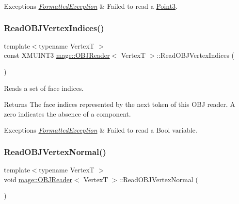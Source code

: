 \begin{DoxyExceptions}{Exceptions}
{\em \hyperlink{structmage_1_1_formatted_exception}{Formatted\+Exception}} & Failed to read a {\ttfamily \hyperlink{structmage_1_1_point3}{Point3}}. \\
\hline
\end{DoxyExceptions}
\hypertarget{classmage_1_1_o_b_j_reader_a2e807f8c18874135888d1e99d4d08d90}{}\label{classmage_1_1_o_b_j_reader_a2e807f8c18874135888d1e99d4d08d90} 
\subsubsection{\texorpdfstring{Read\+O\+B\+J\+Vertex\+Indices()}{ReadOBJVertexIndices()}}
{\footnotesize\ttfamily template$<$typename VertexT $>$ \\
const X\+M\+U\+I\+N\+T3 \hyperlink{classmage_1_1_o_b_j_reader}{mage\+::\+O\+B\+J\+Reader}$<$ VertexT $>$\+::Read\+O\+B\+J\+Vertex\+Indices (\begin{DoxyParamCaption}{ }\end{DoxyParamCaption})\hspace{0.3cm}{\ttfamily [private]}}

Reads a set of face indices.

\begin{DoxyReturn}{Returns}
The face indices represented by the next token of this O\+BJ reader. A zero indicates the absence of a component. 
\end{DoxyReturn}

\begin{DoxyExceptions}{Exceptions}
{\em \hyperlink{structmage_1_1_formatted_exception}{Formatted\+Exception}} & Failed to read a Bool variable. \\
\hline
\end{DoxyExceptions}
\hypertarget{classmage_1_1_o_b_j_reader_aa9ef2ced0ad787b13818722c7dfa0636}{}\label{classmage_1_1_o_b_j_reader_aa9ef2ced0ad787b13818722c7dfa0636} 
\subsubsection{\texorpdfstring{Read\+O\+B\+J\+Vertex\+Normal()}{ReadOBJVertexNormal()}}
{\footnotesize\ttfamily template$<$typename VertexT $>$ \\
void \hyperlink{classmage_1_1_o_b_j_reader}{mage\+::\+O\+B\+J\+Reader}$<$ VertexT $>$\+::Read\+O\+B\+J\+Vertex\+Normal (\begin{DoxyParamCaption}{ }\end{DoxyParamCaption})\hspace{0.3cm}{\ttfamily [private]}}

